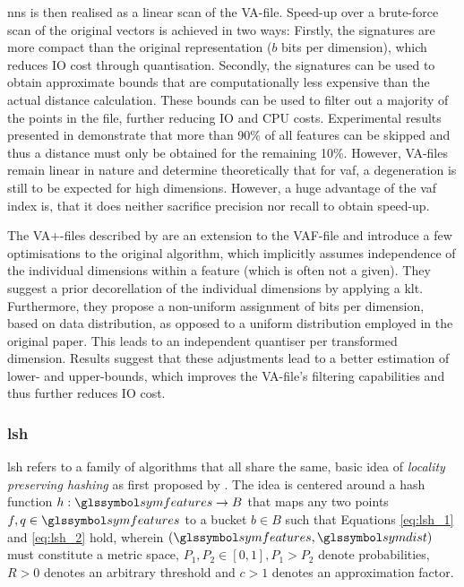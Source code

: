 \acrshort{nns} is then realised as a linear scan of the VA-file. Speed-up over a brute-force scan of the original vectors is achieved in two ways: Firstly, the signatures are more compact than the original representation ($b$ bits per dimension), which reduces IO cost through quantisation. Secondly, the signatures can be used to obtain approximate bounds that are computationally less expensive than the actual distance calculation. These bounds can be used to filter out a majority of the points in the file, further reducing IO and CPU costs. Experimental results presented in \cite{Weber:1998Va} demonstrate that more than 90\% of all features can be skipped and thus a distance must only be obtained for the remaining 10\%. However, VA-files remain linear in nature and \cite{Echihabi:2021High} determine theoretically that for \acrshort{vaf}, a degeneration is still to be expected for high dimensions. However, a huge advantage of the \acrshort{vaf} index is, that it does neither sacrifice precision nor recall to obtain speed-up.

The VA+-files described by \cite{Ferhatosmanoglu:2000Vector} are an extension to the VAF-file and introduce a few optimisations to the original algorithm, which implicitly assumes independence of the individual dimensions within a feature (which is often not a given). They suggest a prior decorellation of the individual dimensions by applying a \acrfull{klt}. Furthermore, they propose a non-uniform assignment of bits per dimension, based on data distribution, as opposed to a uniform distribution employed in the original paper. This leads to an independent quantiser per transformed dimension. Results suggest that these adjustments lead to a better estimation of lower- and upper-bounds, which improves the VA-file's filtering capabilities and thus further reduces IO cost.

\subsubsection{\texorpdfstring{\acrfull{lsh}}{Locality Sensitive Hashing (LSH)}}

\acrshort{lsh} refers to a family of algorithms \cite{Echihabi:2021High,Wang:2017ASurvey} that all share the same, basic idea of \emph{locality preserving hashing} as first proposed by \cite{Indyk1998:Approximate}. The idea is centered around a hash function $h: \symfeatures \rightarrow B$ that maps any two points $f,q \in \symfeatures$ to a bucket $b \in B$ such that Equations \ref{eq:lsh_1} and \ref{eq:lsh_2} hold, wherein $(\symfeatures, \symdist)$ must constitute a metric space, $P_1, P_2 \in [0, 1], P_1 > P_2$ denote probabilities, $R > 0$ denotes an arbitrary threshold and $c > 1$ denotes an approximation factor.

